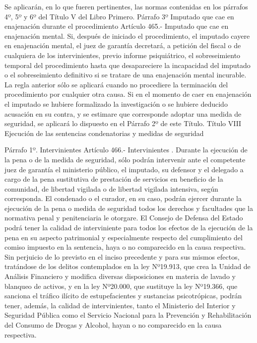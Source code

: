     Se aplicarán, en lo que fueren pertinentes, las normas contenidas en los párrafos 4º, 5º y 6º del Título V del Libro Primero.
    Párrafo 3º Imputado que cae en enajenación durante
el procedimiento
    Artículo 465.- Imputado que cae en enajenación mental. Si, después de iniciado el procedimiento, el imputado cayere en enajenación mental, el juez de garantía decretará, a petición del fiscal o de cualquiera de los intervinientes, previo informe psiquiátrico, el sobreseimiento temporal del procedimiento hasta que desapareciere la incapacidad del imputado o el sobreseimiento definitivo si se tratare de una enajenación mental incurable.
    La regla anterior sólo se aplicará cuando no procediere la terminación del procedimiento por cualquier otra causa.
    Si en el momento de caer en enajenación el imputado se hubiere formalizado la investigación o se hubiere deducido acusación en su contra, y se estimare que corresponde adoptar una medida de seguridad, se aplicará lo dispuesto en el Párrafo 2º de este Título.
    Título VIII
    Ejecución de las sentencias condenatorias y medidas
de seguridad

    Párrafo 1º. Intervinientes
    Artículo 466.- Intervinientes . Durante la ejecución de la pena o de la medida de seguridad, sólo podrán intervenir ante el competente juez de garantía el ministerio público, el imputado, su defensor y el delegado a cargo de la pena sustitutiva de prestación de servicios en beneficio de la comunidad, de libertad vigilada o de libertad vigilada intensiva, según corresponda.
    El condenado o el curador, en su caso, podrán ejercer durante la ejecución de la pena o medida de seguridad todos los derechos y facultades que la normativa penal y penitenciaria le otorgare.
    El Consejo de Defensa del Estado podrá tener la calidad de interviniente para todos los efectos de la ejecución de la pena en su aspecto patrimonial y especialmente respecto del cumplimiento del comiso impuesto en la sentencia, haya o no comparecido en la causa respectiva.
    Sin perjuicio de lo previsto en el inciso precedente y para sus mismos efectos, tratándose de los delitos contemplados en la ley Nº19.913, que crea la Unidad de Análisis Financiero y modifica diversas disposiciones en materia de lavado y blanqueo de activos, y en la ley Nº20.000, que sustituye la ley Nº19.366, que sanciona el tráfico ilícito de estupefacientes y sustancias psicotrópicas, podrán tener, además, la calidad de intervinientes, tanto el Ministerio del Interior y Seguridad Pública como el Servicio Nacional para la Prevención y Rehabilitación del Consumo de Drogas y Alcohol, hayan o no comparecido en la causa respectiva.


